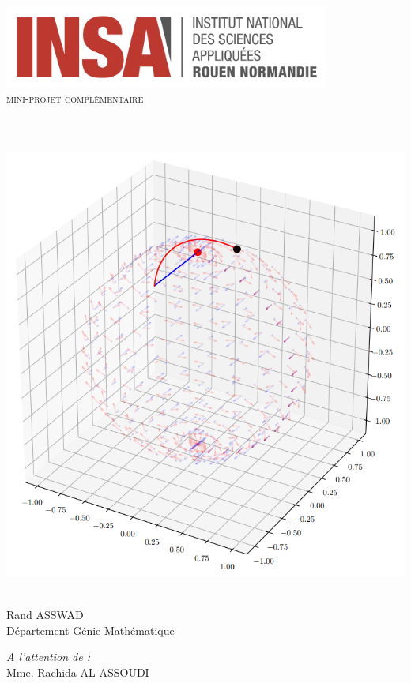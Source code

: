 \begin{titlepage}
    \begin{sffamily}
        \begin{center}
            \includegraphics[width=0.8\textwidth]{img/logo}\\[2cm]

            \textsc{\huge mini-projet complémentaire}\\[1cm]

            \HRule \\[0.4cm]
            {\huge \bfseries \@title \\[0.4cm]}
            \HRule \\[1.5cm]

            \includegraphics[width=.5\textwidth]{img/cover_img}~\\[2cm]

            \begin{minipage}{0.4\textwidth}
            \begin{flushleft} \large
                Rand ASSWAD\\
                Département Génie Mathématique
            \end{flushleft}
            \end{minipage}
            \begin{minipage}{0.4\textwidth}
            \begin{flushright} \large
                \emph{A l'attention de :}\\
                Mme. Rachida AL ASSOUDI
            \end{flushright}
            \end{minipage}

            \vfill
            {\large \@date}
        \end{center}
    \end{sffamily}
\end{titlepage}
\makeatother

